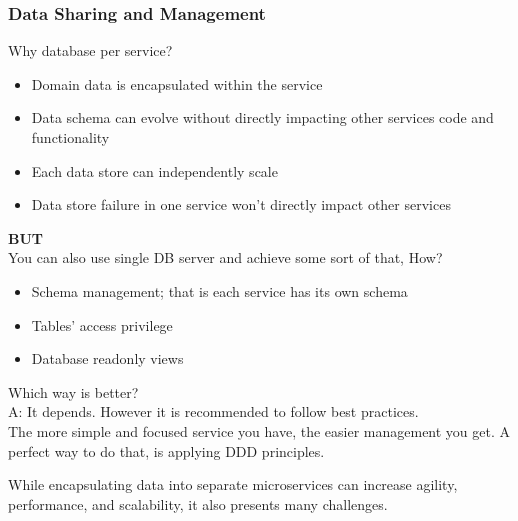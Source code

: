 \documentclass{beamer}
\begin{document}
		\begin{frame}
			\frametitle{Data Sharing and Management}
			Why database per service?
			\begin{itemize}
				\item \scriptsize{Domain data is encapsulated within the service }
				\item \scriptsize{Data schema can evolve without directly impacting other services code and functionality}
				\item \scriptsize{Each data store can independently scale}
				\item \scriptsize{Data store failure in one service won't directly impact other services}
			\end{itemize}
			
			\vspace{5mm}
			\textbf{BUT}\\
			\hspace{3mm} \scriptsize{You can also use single DB server and achieve some sort of that, How?}
			\begin{itemize}
				\item \scriptsize{Schema management; that is each service has its own schema}
				\item \scriptsize{Tables' access privilege}
				\item \scriptsize{Database readonly views}
			\end{itemize}
			
			\vspace{5mm}
			Which way is better? \\
			\hspace{3mm} \scriptsize {A: It depends. However it is recommended to follow best practices}.\\
			\hspace{3mm} \scriptsize {The more simple and focused service you have, the easier management you get. A perfect way to do that, is applying DDD principles}.
			
			\vspace{2mm}
			\scriptsize{ \alert{While encapsulating data into separate microservices can increase agility, performance, and scalability, it also presents many challenges.}}
			\vspace{100mm}
		\end{frame}
	
\end{document}
